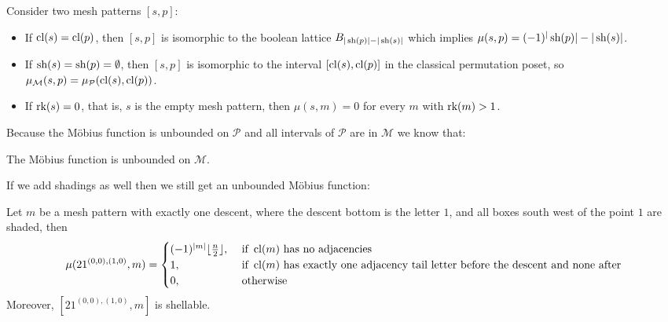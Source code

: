 \documentclass[11pt,a4paper,oneside]{article}
\begin{document}
\begin{lem}
Consider two mesh patterns $[s,p]$:
\begin{itemize}
\item If $\operatorname{\textrm{cl}}(s)=\operatorname{\textrm{cl}}(p)$, then $[s,p]$ is isomorphic to the boolean lattice $B_{|\operatorname{\textrm{sh}}(p)|-|\operatorname{\textrm{sh}}(s)|}$ which implies $\mu(s,p)=(-1)^|\operatorname{\textrm{sh}}(p)|-|\operatorname{\textrm{sh}}(s)|$.
\item If $\operatorname{\textrm{sh}}(s)=\operatorname{\textrm{sh}}(p)=\emptyset$, then $[s,p]$ is isomorphic to the interval $[\operatorname{\textrm{cl}}(s),\operatorname{\textrm{cl}}(p)]$ in the classical permutation poset, so $\operatorname{\mu_\mathcal{M}}(s,p)=\operatorname{\mu_\mathcal{P}}(\operatorname{\textrm{cl}}(s),\operatorname{\textrm{cl}}(p))$.
\item If $\operatorname{\textrm{rk}}(s)=0$, that is, $s$ is the empty mesh pattern, then $\mu(s,m)=0$ for every $m$ with $\operatorname{\textrm{rk}}(m)>1$.
\end{itemize}
\end{lem}

Because the M\"obius function is unbounded on $\mathcal{P}$ and all intervals of $\mathcal{P}$ are in $\mathcal{M}$ we know that:
\begin{cor}
The M\"obius function is unbounded on $\mathcal{M}$.
\end{cor}

If we add shadings as well then we still get an unbounded M\"obius function:
\begin{lem}
Let $m$ be a mesh pattern with exactly one descent, where the descent bottom is the letter $1$, and all boxes south west of the point $1$ are shaded, then $$\mu(21^{(0,0),(1,0)},m)=\begin{cases}
(-1)^{|m|}\lfloor\frac{n}{2}\rfloor,&\mbox{ if } \operatorname{\textrm{cl}}(m) \mbox{ has no adjacencies}\\
1,&\mbox{ if } \operatorname{\textrm{cl}}(m) \mbox{ has exactly one adjacency tail letter before the descent and none after}\\
0, &\mbox{ otherwise}
\end{cases}$$
Moreover, $[21^{(0,0),(1,0)},m]$ is shellable.
\end{lem}
\end{document}
